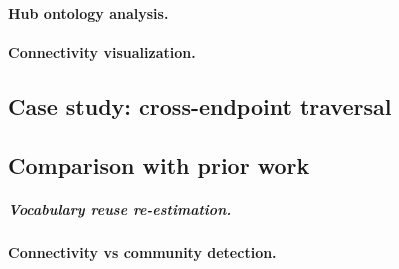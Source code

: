 \documentclass[12pt]{article}
\begin{document}
\paragraph*{Hub ontology analysis.}

\paragraph*{Connectivity visualization.}


\subsection{Case study: cross-endpoint traversal}
\label{sec:results-case-study}



\subsection{Comparison with prior work}
\label{sec:results-comparison}


\subparagraph*{Vocabulary reuse re-estimation.}

\paragraph*{Connectivity vs community detection.}
\end{document}
